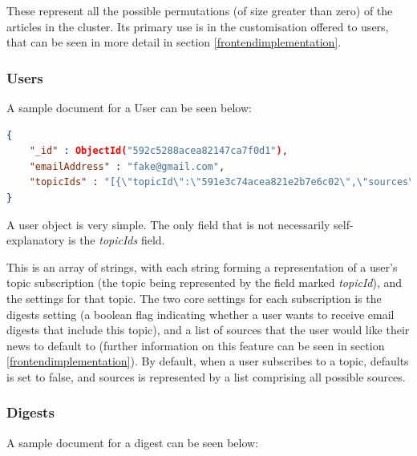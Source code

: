 \documentclass[12pt]{article}
\begin{document}
These represent all the possible permutations (of size greater than zero) of the articles in the cluster. Its primary use is in the customisation offered to users, that can be seen in more detail in section \ref{frontendimplementation}.

\subsubsection{Users}

A sample document for a User can be seen below:

\begin{lstlisting}[language=json, firstnumber=1, caption={A sample document in the Users table}]
{
    "_id" : ObjectId("592c5288acea82147ca7f0d1"),
    "emailAddress" : "fake@gmail.com",
    "topicIds" : "[{\"topicId\":\"591e3c74acea821e2b7e6c02\",\"sources\":[\"wikipedia\",\"business-insider-uk\",\"daily-mail\",\"espn-cric-info\",\"metro\",\"mirror\",\"newsweek\",\"sky-sports-news\",\"the-telegraph\",\"the-times-of-india\",\"bbc-news\",\"bbc-sport\",\"bloomberg\",\"cnn\",\"cnbc\",\"espn\",\"four-four-two\",\"the-washington-post\",\"the-wall-street-journal\",\"associated-press\",\"the-guardian-uk\"],\"digests\":false}]"
}
\end{lstlisting}

A user object is very simple. The only field that is not necessarily self-explanatory is the \emph{topicIds} field. 

This is an array of strings, with each string forming a representation of a user's topic subscription (the topic being represented by the field marked \emph{topicId}), and the settings for that topic. The two core settings for each subscription is the digests setting (a boolean flag indicating whether a user wants to receive email digests that include this topic), and a list of sources that the user would like their news to default to (further information on this feature can be seen in section \ref{frontendimplementation}). By default, when a user subscribes to a topic, defaults is set to false, and sources is represented by a list comprising all possible sources.

\subsubsection{Digests}

A sample document for a digest can be seen below:
\end{document}
